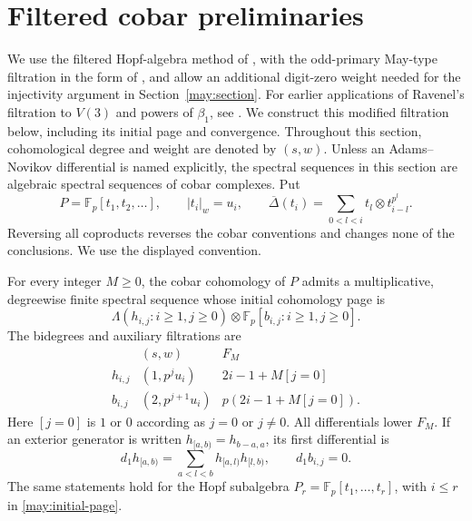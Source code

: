\section{Filtered cobar preliminaries}
\label{may:preliminaries}

We use the filtered Hopf-algebra method of \citet{May1966}, with
the odd-primary May-type filtration in the form of
\citet[Theorem~3.2.5]{Ravenel2004}, and allow an additional digit-zero
weight needed for the injectivity argument in Section~\ref{may:section}.
For earlier applications of Ravenel's filtration to $V(3)$ and powers
of $\beta_1$, see \citet{LeeRavenel1994}.
We construct this modified filtration below, including its initial page
and convergence. Throughout this section, cohomological degree and weight are denoted by
$(s,w)$.  Unless an Adams--Novikov differential is named explicitly, the
spectral sequences in this section are algebraic spectral sequences of
cobar complexes.  Put
\[
 P=\mathbb F_p[t_1,t_2,\ldots],\qquad
 |t_i|_w=u_i,
 \qquad
 \overline\Delta(t_i)=\sum_{0<l<i}t_l\otimes t_{i-l}^{p^l}.
\]
Reversing all coproducts reverses the cobar conventions and changes none of
the conclusions.  We use the displayed convention.

\begin{lemma}
\label{may:page}
For every integer $M\geq0$, the cobar cohomology of $P$ admits a
multiplicative, degreewise finite spectral sequence whose initial
cohomology page is
\begin{equation}
 \Lambda(h_{i,j}:i\geq1,j\geq0)
 \otimes\mathbb F_p[b_{i,j}:i\geq1,j\geq0].
 \label{may:initial-page}
\end{equation}
The bidegrees and auxiliary filtrations are
\[
\begin{array}{c|c|c}
 & (s,w)& F_M\\ \hline
 h_{i,j}&(1,p^ju_i)&2i-1+M[j=0]\\
 b_{i,j}&(2,p^{j+1}u_i)&p(2i-1+M[j=0]).
\end{array}
\]
Here $[j=0]$ is $1$ or $0$ according as $j=0$ or $j\neq0$.
All differentials lower $F_M$.  If an exterior generator is written
$h_{[a,b)}=h_{b-a,a}$, its first differential is
\begin{equation}
 d_1 h_{[a,b)}=\sum_{a<l<b}h_{[a,l)}h_{[l,b)},
 \qquad d_1b_{i,j}=0.
 \label{may:splitting}
\end{equation}
The same statements hold for the Hopf subalgebra
$P_r=\mathbb F_p[t_1,\ldots,t_r]$, with $i\leq r$ in
\eqref{may:initial-page}.
\end{lemma}

